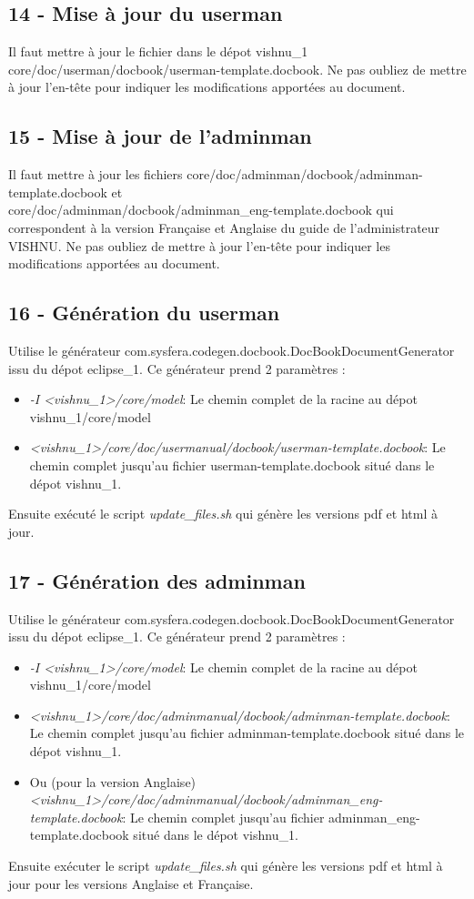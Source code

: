 \documentclass{article}
\begin{document}
\subsection{14 - Mise à jour du userman}
Il faut mettre à jour le fichier dans le dépot vishnu\_1
core/doc/userman/docbook/userman-template.docbook. Ne pas oubliez
de mettre à jour l'en-tête pour indiquer les modifications apportées
au document.

\subsection{15 - Mise à jour de l'adminman}
Il faut mettre à jour les fichiers core/doc/adminman/docbook/adminman-template.docbook
 et \\
 core/doc/adminman/docbook/adminman\_eng-template.docbook qui correspondent
à la version Française et Anglaise du guide de l'administrateur VISHNU.
Ne pas oubliez de mettre à jour l'en-tête pour indiquer les modifications 
apportées au document.

\subsection{16 - Génération du userman}
Utilise le générateur com.sysfera.codegen.docbook.DocBookDocumentGenerator
issu du dépot eclipse\_1. Ce générateur prend 2 paramètres :
\begin{itemize}
\item \textit{-I <vishnu\_1>/core/model}: Le chemin complet de la racine au dépot 
vishnu\_1/core/model
\item \textit{<vishnu\_1>/core/doc/usermanual/docbook/userman-template.docbook}:
 Le chemin complet jusqu'au fichier userman-template.docbook
 situé dans le dépot vishnu\_1.
\end{itemize}
Ensuite exécuté le script \textit{update\_files.sh} qui génère les versions
pdf et html à jour.

\subsection{17 - Génération des adminman}
Utilise le générateur com.sysfera.codegen.docbook.DocBookDocumentGenerator
issu du dépot eclipse\_1. Ce générateur prend 2 paramètres :
\begin{itemize}
\item \textit{-I <vishnu\_1>/core/model}: Le chemin complet de la racine au dépot 
vishnu\_1/core/model
\item \textit{<vishnu\_1>/core/doc/adminmanual/docbook/adminman-template.docbook}:
 Le chemin complet jusqu'au fichier adminman-template.docbook
 situé dans le dépot vishnu\_1.
\item Ou (pour la version Anglaise) \textit{<vishnu\_1>/core/doc/adminmanual/docbook/adminman\_eng-template.docbook}:
 Le chemin complet jusqu'au fichier adminman\_eng-template.docbook
 situé dans le dépot vishnu\_1.
\end{itemize}
Ensuite exécuter le script \textit{update\_files.sh} qui génère les versions
pdf et html à jour pour les versions Anglaise et Française.
\end{document}

